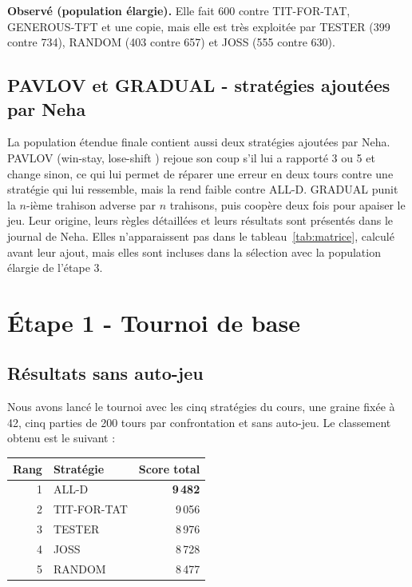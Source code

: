 \documentclass[10pt,a4paper]{article}
\begin{document}
\textbf{Observé (population élargie).} Elle fait 600 contre TIT-FOR-TAT, GENEROUS-TFT et une copie, mais elle est très exploitée
par TESTER (399 contre 734), RANDOM (403 contre 657) et JOSS (555 contre 630).

\subsection{PAVLOV et GRADUAL - stratégies ajoutées par Neha}
La population étendue finale contient aussi deux stratégies ajoutées par Neha. PAVLOV (\og win-stay, lose-shift \fg{})
rejoue son coup s'il lui a rapporté 3 ou 5 et change sinon, ce qui lui permet de réparer une erreur en deux tours contre une
stratégie qui lui ressemble, mais la rend faible contre ALL-D. GRADUAL punit la $n$-ième trahison adverse par $n$ trahisons,
puis coopère deux fois pour apaiser le jeu. Leur origine, leurs règles détaillées et leurs résultats sont présentés dans le
journal de Neha. Elles n'apparaissent pas dans le tableau~\ref{tab:matrice}, calculé avant leur ajout, mais elles sont
incluses dans la sélection avec la population élargie de l'étape 3.

\section{Étape 1 - Tournoi de base}

\subsection{Résultats sans auto-jeu}
Nous avons lancé le tournoi avec les cinq stratégies du cours, une graine fixée à 42, cinq parties de 200 tours par
confrontation et sans auto-jeu. Le classement obtenu est le suivant :
\begin{center}
\small
\begin{tabular}{@{}rlr@{}}
\toprule
Rang & Stratégie & Score total \\
\midrule
1 & ALL-D & \textbf{9\,482} \\
2 & TIT-FOR-TAT & 9\,056 \\
3 & TESTER & 8\,976 \\
4 & JOSS & 8\,728 \\
5 & RANDOM & 8\,477 \\
\bottomrule
\end{tabular}
\end{center}
\end{document}
